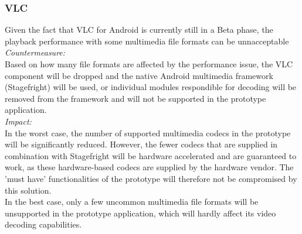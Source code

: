 \subsubsection{VLC}
Given the fact that VLC for Android is currently still in a Beta phase, the playback performance with some multimedia file formats can be unnacceptable\\
\newline
\textit{Countermeasure:}\\
Based on how many file formats are affected by the performance issue, the VLC component will be dropped and the native Android multimedia framework (Stagefright) will be used, or individual modules respondible for decoding will be removed from the framework and will not be supported in the prototype application.\\
\newline
\textit{Impact:}\\
In the worst case, the number of supported multimedia codecs in the prototype will be significantly reduced. However, the fewer codecs that are supplied in combination with Stagefright will be hardware accelerated and are guaranteed to work, as these hardware-based codecs are supplied by the hardware vendor. The 'must have' functionalities of the prototype will therefore not be compromised by this solution.\\
\newline
In the best case, only a few uncommon multimedia file formats will be unsupported in the prototype application, which will hardly affect its video decoding capabilities.





